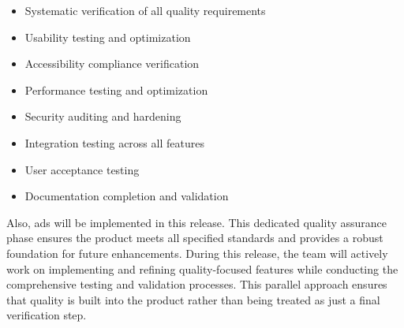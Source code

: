 \begin{itemize}
\item Systematic verification of all quality requirements
\item Usability testing and optimization
\item Accessibility compliance verification
\item Performance testing and optimization
\item Security auditing and hardening
\item Integration testing across all features
\item User acceptance testing
\item Documentation completion and validation
\end{itemize}

Also, ads will be implemented in this release. This dedicated quality assurance phase ensures the product meets all specified standards and provides a robust foundation for future enhancements. During this release, the team will actively work on implementing and refining quality-focused features while conducting the comprehensive testing and validation processes. This parallel approach ensures that quality is built into the product rather than being treated as just a final verification step.
